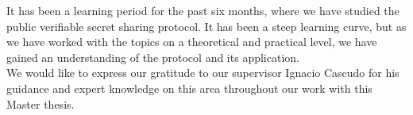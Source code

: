 
It has been a learning period for the past six months, where we have studied the public verifiable secret sharing protocol. It has been a steep learning curve, but as we have worked with the topics on  a theoretical and practical level, we have gained an understanding of the protocol and its application.\\

\noindent
We would like to express our gratitude to our supervisor Ignacio Cascudo for his guidance and expert knowledge on this area throughout our work with this Master thesis. 